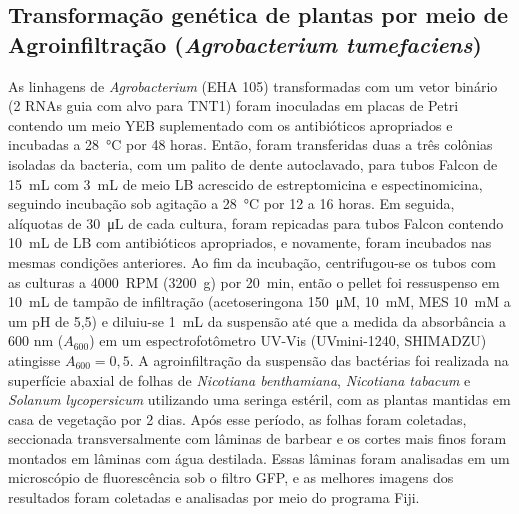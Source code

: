 \subsection{Transformação genética de plantas por meio de Agroinfiltração (\textit{Agrobacterium tumefaciens})}
As linhagens de \textit{Agrobacterium} (EHA 105) transformadas com um vetor
binário (2 RNAs guia com alvo para TNT1) foram inoculadas em placas de Petri
contendo um meio YEB suplementado com os antibióticos apropriados e incubadas a
\qty{28}{\celsius} por 48 horas. Então, foram transferidas duas a três colônias
isoladas da bacteria, com um palito de dente autoclavado, para tubos Falcon de
\qty{15}{mL} com \qty{3}{mL} de meio LB acrescido de estreptomicina e
espectinomicina, seguindo incubação sob agitação a \qty{28}{\celsius} por 12 a
16 horas. Em seguida, alíquotas de \qty{30}{\micro L} de cada cultura, foram
repicadas para tubos Falcon contendo \qty{10}{mL} de LB com antibióticos
apropriados, e novamente, foram incubados nas mesmas condições anteriores. Ao fim
da incubação, centrifugou-se os tubos com as culturas a \qty{4000}{RPM}
(\qty{3200}{g}) por \qty{20}{min}, então o pellet foi ressuspenso em
\qty{10}{mL} de tampão de infiltração (acetoseringona \qty{150}{\micro M},
 \qty{10}{mM}, MES \qty{10}{mM} a um pH de 5,5) e diluiu-se \qty{1}{mL}
da suspensão até que a medida da absorbância a 600 nm ($A_{600}$) em um
espectrofotômetro UV-Vis (UVmini-1240, SHIMADZU) atingisse
$A_{600} = 0,5$.
A agroinfiltração da suspensão das bactérias foi realizada na superfície abaxial
de folhas de \textit{Nicotiana benthamiana}, \textit{Nicotiana tabacum} e
\textit{Solanum lycopersicum} utilizando uma seringa estéril, com as plantas
mantidas em casa de vegetação por 2 dias. Após esse período, as folhas foram
coletadas, seccionada transversalmente com lâminas de barbear e os cortes mais
finos foram montados em lâminas com água destilada. Essas lâminas foram
analisadas em um microscópio de fluorescência sob o filtro GFP, e as melhores
imagens dos resultados foram coletadas e analisadas por meio do programa Fiji.  
